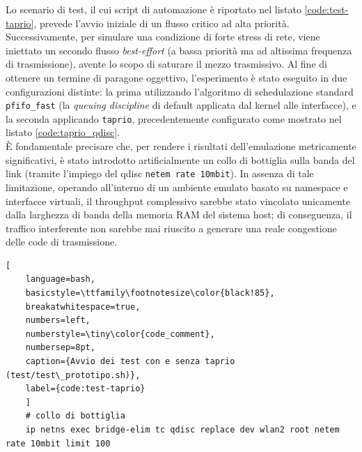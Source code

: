 \documentclass[12pt,a4paper,twoside]{book}
\begin{document}
\begin{onehalfspace}
Lo scenario di test, il cui script di automazione è riportato nel listato \ref{code:test-taprio}, prevede l'avvio iniziale di un flusso critico ad alta priorità. Successivamente, per simulare una condizione di forte stress di rete, viene iniettato un secondo flusso \textit{best-effort} (a bassa priorità ma ad altissima frequenza di trasmissione), avente lo scopo di saturare il mezzo trasmissivo. Al fine di ottenere un termine di paragone oggettivo, l'esperimento è stato eseguito in due configurazioni distinte: la prima utilizzando l'algoritmo di schedulazione standard \texttt{pfifo\_fast} (la \textit{queuing discipline} di default applicata dal kernel alle interfacce), e la seconda applicando \texttt{taprio}, precedentemente configurato come mostrato nel listato \ref{code:taprio_qdisc}.
\\
È fondamentale precisare che, per rendere i risultati dell'emulazione metricamente significativi, è stato introdotto artificialmente un collo di bottiglia sulla banda del link (tramite l'impiego del qdisc \texttt{netem rate 10mbit}). In assenza di tale limitazione, operando all'interno di un ambiente emulato basato su namespace e interfacce virtuali, il throughput complessivo sarebbe stato vincolato unicamente dalla larghezza di banda della memoria RAM del sistema host; di conseguenza, il traffico interferente non sarebbe mai riuscito a generare una reale congestione delle code di trasmissione.

\begin{lstlisting}[
    language=bash,
    basicstyle=\ttfamily\footnotesize\color{black!85},
    breakatwhitespace=true,
    numbers=left,
    numberstyle=\tiny\color{code_comment},
    numbersep=8pt,
    caption={Avvio dei test con e senza taprio (test/test\_prototipo.sh)},
    label={code:test-taprio}
    ]
    # collo di bottiglia
    ip netns exec bridge-elim tc qdisc replace dev wlan2 root netem rate 10mbit limit 100


\end{lstlisting}
\end{onehalfspace}
\end{document}
